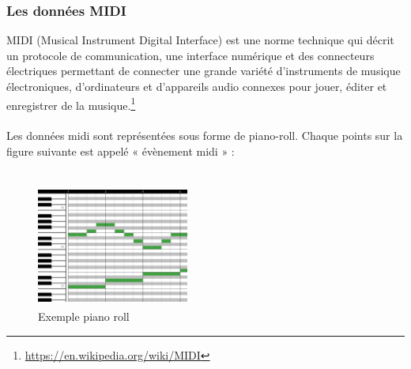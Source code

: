 \subsubsection{Les données MIDI}
MIDI (Musical Instrument Digital Interface) est une norme technique qui décrit un protocole de communication, une interface numérique et des connecteurs électriques permettant de connecter une grande variété d'instruments de musique électroniques, d'ordinateurs et d'appareils audio connexes pour jouer, éditer et enregistrer de la musique.\footnote{\url{https://en.wikipedia.org/wiki/MIDI}}\\\\
Les données midi sont représentées sous forme de piano-roll. Chaque points sur la figure suivante est appelé « évènement midi » :\\\\
\begin{figure}[h]
	\includegraphics[height=40mm, width=50mm]{z_images/2_midi/exemple_midi_piano.jpg}
	\caption{Exemple piano roll}
\end{figure}


